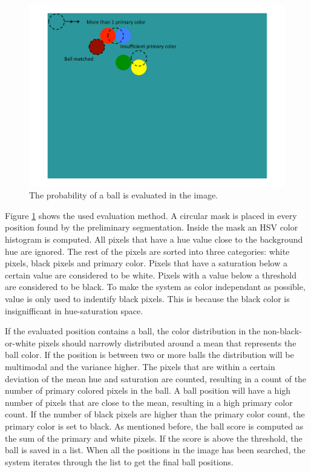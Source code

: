 \begin{figure}[h]
\begin{center}
\includegraphics{images/ballfind.pdf}
\caption{The probability of a ball is evaluated in the image.}
\label{fig:ballfind}
\end{center}
\end{figure}
Figure \ref{fig:ballfind} shows the used evaluation method. A circular mask is placed in every position found by the preliminary segmentation. Inside the mask an HSV color histogram is computed. All pixels that have a hue value close to the background hue are ignored. The rest of the pixels are sorted into three categories: white pixels, black pixels and primary color. Pixels that have a saturation below a certain value are considered to be white. Pixels with a value below a threshold are considered to be black. To make the system as color independant as possible, value is only used to indentify black pixels. This is because the black color is insignifficant in hue-saturation space.

If the evaluated position contains a ball, the color distribution in the non-black-or-white pixels should narrowly distributed around a mean that represents the ball color. If the position is between two or more balls the distribution will be multimodal and the variance higher. The pixels that are within a certain deviation of the mean hue and saturation are counted, resulting in a count of the number of primary colored pixels in the ball. A ball position will have a high number of pixels that are close to the mean, resulting in a high primary color count. If the number of black pixels are higher than the primary color count, the primary color is set to black.
As mentioned before, the ball score is computed as the sum of the primary and white pixels. If the score is above the threshold, the ball is saved in a list. When all the positions in the image has been searched, the system iterates through the list to get the final ball positions.


